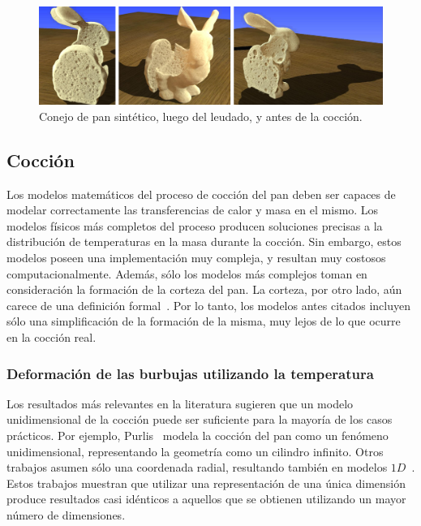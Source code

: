 \begin{figure}
\includegraphics[width=12cm]{figures/prebakebunny}
\caption{Conejo de pan sintético, luego del leudado, y antes de la cocción.}
\label{fg:provingBunny}
\end{figure}

\subsection{Cocción}
Los modelos matemáticos del proceso de cocción del pan deben ser capaces de modelar correctamente las transferencias de calor y masa en el mismo.
Los modelos físicos más completos del proceso producen soluciones precisas a la distribución de temperaturas en la masa durante la cocción.
Sin embargo, estos modelos poseen una implementación muy compleja, y resultan muy costosos computacionalmente.
Además, sólo los modelos más complejos toman en consideración la formación de la corteza del pan.
La corteza, por otro lado, aún carece de una definición formal~\cite{Vanin2009}.
Por lo tanto, los modelos antes citados incluyen sólo una simplificación de la formación de la misma, muy lejos de lo que ocurre en la cocción real.

\subsubsection{Deformación de las burbujas utilizando la temperatura}
Los resultados más relevantes en la literatura sugieren que un modelo unidimensional de la cocción puede ser suficiente para la mayoría de los casos prácticos.
Por ejemplo, Purlis~\cite{Purlis2011} modela la cocción del pan como un fenómeno unidimensional, representando la geometría como un cilindro infinito.
Otros trabajos asumen sólo una coordenada radial, resultando también en modelos $1D$~\cite{Powathil2004, Thorvaldsson1999}.
Estos trabajos muestran que utilizar una representación de una única dimensión produce resultados casi idénticos a aquellos que se obtienen utilizando un mayor número de dimensiones.

